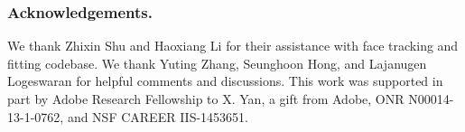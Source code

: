 \documentclass[runningheads]{llncs}
\newcommand{\cutsectiondown}{\vspace*{-0.12in}}
\begin{document}
\clearpage
\subsubsection*{Acknowledgements.}
\cutsectiondown
We thank Zhixin Shu and Haoxiang Li for their assistance with face tracking and fitting codebase. 
We thank Yuting Zhang, Seunghoon Hong, and Lajanugen Logeswaran for helpful comments and discussions.
This work was supported in part by Adobe Research Fellowship to X. Yan, a gift from Adobe, ONR N00014-13-1-0762, and NSF CAREER IIS-1453651.

{\small


}
\end{document}

